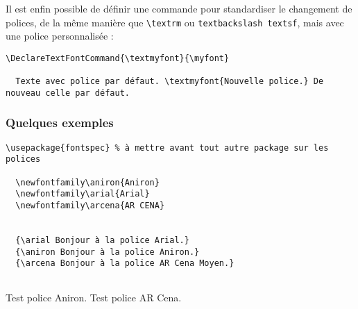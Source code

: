 Il est enfin possible de définir une commande pour standardiser le changement de polices, de la même manière que \texttt{\textbackslash textrm} ou \texttt{textbackslash textsf},  mais avec une police personnalisée :

\begin{lstlisting}[language={[LaTeX]TeX}]
  \DeclareTextFontCommand{\textmyfont}{\myfont}

  Texte avec police par défaut. \textmyfont{Nouvelle police.} De nouveau celle par défaut.
\end{lstlisting}

\subsubsection{Quelques exemples}
\begin{minipage}{.6\textwidth}
\begin{lstlisting}[language={[LaTeX]TeX}]
  \usepackage{fontspec} % à mettre avant tout autre package sur les polices

  \newfontfamily\aniron{Aniron}
  \newfontfamily\arial{Arial}
  \newfontfamily\arcena{AR CENA}

  
  {\arial Bonjour à la police Arial.}
  {\aniron Bonjour à la police Aniron.}
  {\arcena Bonjour à la police AR Cena Moyen.}
  
\end{lstlisting}
\end{minipage}
\hfill%
\begin{minipage}{.35\textwidth}
\newline
{\aniron Test police Aniron.}
\newline
{\arcena Test police AR Cena.}
\end{minipage}
\hfill\rule{0pt}{0pt}

